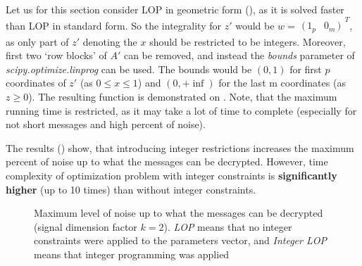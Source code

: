 \documentclass{article}
\newcommand{\irow}[1]{%
  {\begin{smallmatrix}(\,#1\,)\end{smallmatrix}}^T
}
\begin{document}
Let us for this section consider LOP in geometric form (), as it is solved faster than LOP in standard form. So the integrality for $z'$ would be $w = \irow{1_p & 0_m}$, as only part of $z'$ denoting the $x$ should be restricted to be integers. Moreover, first two `row blocks' of $A'$ can be removed, and instead the \textit{bounds} parameter of \textit{scipy.optimize.linprog} can be used. The bounds would be $(0,1)$ for first $p$ coordinates of $z'$ (as $0 \leq x \leq 1$) and $(0, +\inf)$ for the last m coordinates (as $z \geq 0$). The resulting function is demonstrated on . Note, that the maximum running time is restricted, as it may take a lot of time to complete (especially for not short messages and high percent of noise).

The results () show, that introducing integer restrictions increases the maximum percent of noise up to what the messages can be decrypted. However, time complexity of optimization problem with integer constraints is \textbf{significantly higher} (up to 10 times) than without integer constraints.


\begin{figure}[hbt]
  \centering
  \pgfplotsset{compat=1.10}
  \caption[Maximum level of noise up to what the messages can be decrypted (signal dimension factor $k=2$)]
  {Maximum level of noise up to what the messages can be decrypted (signal dimension factor $k=2$).
    \textit{LOP} means that no integer constraints were applied to the parameters vector, and  \textit{Integer LOP} means that integer programming was applied}\label{fig:noise_int}
\end{figure}
\end{document}
